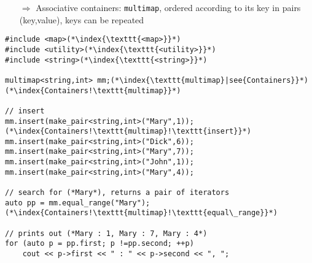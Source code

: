 \documentclass[10pt]{book}
\begin{document}
\begin{enumerate}
\item[$\Rightarrow$] Associative containers: \texttt{multimap}, ordered according to its key in pairs (key,value), keys can be repeated
\end{enumerate}
\begin{lstlisting}
#include <map>(*\index{\texttt{<map>}}*)
#include <utility>(*\index{\texttt{<utility>}}*)
#include <string>(*\index{\texttt{<string>}}*)

multimap<string,int> mm;(*\index{\texttt{multimap}|see{Containers}}*)(*\index{Containers!\texttt{multimap}}*)
 
// insert
mm.insert(make_pair<string,int>("Mary",1));(*\index{Containers!\texttt{multimap}!\texttt{insert}}*)
mm.insert(make_pair<string,int>("Dick",6));
mm.insert(make_pair<string,int>("Mary",7));
mm.insert(make_pair<string,int>("John",1));
mm.insert(make_pair<string,int>("Mary",4));

// search for (*Mary*), returns a pair of iterators
auto pp = mm.equal_range("Mary");(*\index{Containers!\texttt{multimap}!\texttt{equal\_range}}*)

// prints out (*Mary : 1, Mary : 7, Mary : 4*)
for (auto p = pp.first; p !=pp.second; ++p)
    cout << p->first << " : " << p->second << ", ";
\end{lstlisting}
%
%
\end{document}
